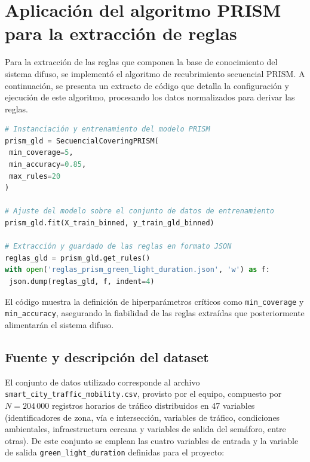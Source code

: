 \documentclass[12pt,a4paper]{article}
\begin{document}

\section{Aplicación del algoritmo PRISM para la extracción de reglas}
\label{sec:prism}

\vspace{0.5cm}
Para la extracción de las reglas que componen la base de conocimiento del sistema difuso, se implementó el algoritmo de recubrimiento secuencial PRISM. A continuación, se presenta un extracto de código que detalla la configuración y ejecución de este algoritmo, procesando los datos normalizados para derivar las reglas.
\begin{lstlisting}[language=Python, caption={Extracto de código de inicialización y ejecución del algoritmo PRISM (\texttt{Extraccion\_Reglas\_PRISM.ipynb})}, label={lst:prism}]
# Instanciación y entrenamiento del modelo PRISM
prism_gld = SecuencialCoveringPRISM(
 min_coverage=5,
 min_accuracy=0.85,
 max_rules=20
)

# Ajuste del modelo sobre el conjunto de datos de entrenamiento
prism_gld.fit(X_train_binned, y_train_gld_binned)

# Extracción y guardado de las reglas en formato JSON
reglas_gld = prism_gld.get_rules()
with open('reglas_prism_green_light_duration.json', 'w') as f:
 json.dump(reglas_gld, f, indent=4)
\end{lstlisting}
El código muestra la definición de hiperparámetros críticos como \texttt{min\_coverage} y \texttt{min\_accuracy}, asegurando la fiabilidad de las reglas extraídas que posteriormente alimentarán el sistema difuso.


\subsection{Fuente y descripción del dataset}

El conjunto de datos utilizado corresponde al archivo
\texttt{smart\_city\_traffic\_mobility.csv}, provisto por el equipo,
compuesto por $N = 204\,000$ registros horarios de tráfico distribuidos
en 47 variables (identificadores de zona, vía e intersección, variables
de tráfico, condiciones ambientales, infraestructura cercana y variables
de salida del semáforo, entre otras). De este conjunto se emplean las
cuatro variables de entrada y la variable de salida
\texttt{green\_light\_duration} definidas para el proyecto:
\end{document}
